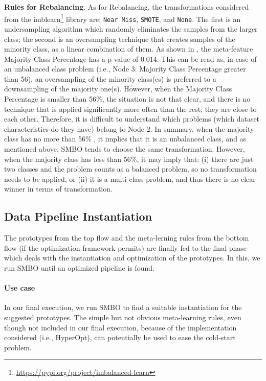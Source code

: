 \textbf{Rules for Rebalancing}. As for Rebalancing, the transformations considered from the imblearn\footnote{\url{https://pypi.org/project/imbalanced-learn}} library are: \texttt{Near Miss}, \texttt{SMOTE}, and \texttt{None}.
The first is an undersampling algorithm which randomly eliminates the samples from the larger class; the second is an oversampling technique that creates samples of the minority class, as a linear combination of them.
As shown in , the meta-feature Majority Class Percentage has a p-value of $0.014$.
This can be read as, in case of an unbalanced class problem (i.e., Node 3: Majority Class Percentage greater than 56), an oversampling of the minority class(es) is preferred to a downsampling of the majority one(s).
However, when the Majority Class Percentage is smaller than 56\%, the situation is not that clear, and there is no technique that is applied significantly more often than the rest; they are close to each other.
Therefore, it is difficult to understand which problems (which dataset characteristics do they have) belong to Node 2.
In summary, when the majority class has no more than 56\% , it implies that it is an unbalanced class, and as mentioned above, SMBO tends to choose the same transformation.
However, when the majority class has less than 56\%, it may imply that: (i) there are just two classes and the problem counts as a balanced problem, so no transformation needs to be applied, or (ii) it is a multi-class problem, and thus there is no clear winner in terms of transformation.

\subsection{Data Pipeline Instantiation}
\label{effective-ssec:prototype-insta}

The prototypes from the top flow and the meta-lerning rules from the bottom flow (if the optimization framework permits) are finally fed to the final phase which deals with the instantiation and optimization of the prototypes. In this, we run SMBO until an optimized pipeline is found.

\paragraph{Use case}
 In our final execution, we run SMBO to find a suitable instantiation for the suggested prototypes. The simple but not obvious meta-learning rules, even though not included in our final execution, because of the implementation considered (i.e., HyperOpt), can potentially be used to ease the cold-start problem.

